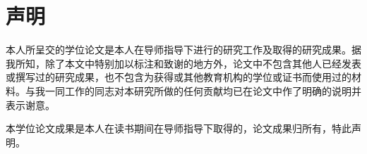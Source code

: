 
\chapter{声明}
本人所呈交的学位论文是本人在导师指导下进行的研究工作及取得的研究成果。据我所知，除了本文中特别加以标注和致谢的地方外，论文中不包含其他人已经发表或撰写过的研究成果，也不包含为获得{\universityname}或其他教育机构的学位或证书而使用过的材料。与我一同工作的同志对本研究所做的任何贡献均已在论文中作了明确的说明并表示谢意。


本学位论文成果是本人在{\universityname}读书期间在导师指导下取得的，论文成果归{\universityname}所有，特此声明。
\vspace{4cm}
\autograph
